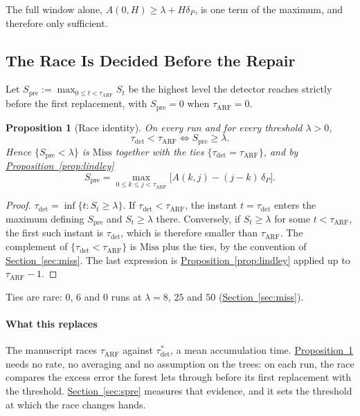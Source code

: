 \documentclass[10pt,conference]{IEEEtran}
\newtheorem{proposition}[theorem]{Proposition}
\theoremstyle{definition}
\begin{document}
\noindent The full window alone, $A(0,H) \ge \lambda + H\delta_P$, is one term of the
maximum, and therefore only sufficient.

\subsection{The Race Is Decided Before the Repair}
\label{sec:race-identity}

Let $S_{\mathrm{pre}} := \max_{0 \le t < \tau_{\mathrm{ARF}}} S_t$ be the highest level the
detector reaches strictly before the first replacement, with $S_{\mathrm{pre}} = 0$ when
$\tau_{\mathrm{ARF}} = 0$.

\begin{proposition}[Race identity]\label{prop:race}
On every run and for every threshold $\lambda > 0$,
\[
  \tau_{\mathrm{det}} < \tau_{\mathrm{ARF}} \iff S_{\mathrm{pre}} \ge \lambda .
\]
Hence $\{S_{\mathrm{pre}} < \lambda\}$ is $\mathrm{Miss}$ together with the ties
$\{\tau_{\mathrm{det}} = \tau_{\mathrm{ARF}}\}$, and by \hyperref[prop:lindley]{Proposition~\ref*{prop:lindley}}
\[
  S_{\mathrm{pre}} = \max_{0 \le k \le j < \tau_{\mathrm{ARF}}}
  \big[A(k,j) - (j-k)\,\delta_P\big].
\]
\end{proposition}

\begin{proof}
$\tau_{\mathrm{det}} = \inf\{t : S_t \ge \lambda\}$. If $\tau_{\mathrm{det}} <
\tau_{\mathrm{ARF}}$, the instant $t = \tau_{\mathrm{det}}$ enters the maximum defining
$S_{\mathrm{pre}}$ and $S_t \ge \lambda$ there. Conversely, if $S_t \ge \lambda$ for some
$t < \tau_{\mathrm{ARF}}$, the first such instant is $\tau_{\mathrm{det}}$, which is
therefore smaller than $\tau_{\mathrm{ARF}}$. The complement of
$\{\tau_{\mathrm{det}} < \tau_{\mathrm{ARF}}\}$ is $\mathrm{Miss}$ plus the ties, by the
convention of \hyperref[sec:miss]{Section~\ref*{sec:miss}}. The last expression is
\hyperref[prop:lindley]{Proposition~\ref*{prop:lindley}} applied up to $\tau_{\mathrm{ARF}} - 1$.
\end{proof}

\noindent Ties are rare: $0$, $6$ and $0$ runs at $\lambda = 8$, $25$ and $50$
(\hyperref[sec:miss]{Section~\ref*{sec:miss}}).

\paragraph{What this replaces} The manuscript races $\tau_{\mathrm{ARF}}$ against
$\tau^*_{\mathrm{det}}$, a mean accumulation time. \hyperref[prop:race]{Proposition~\ref*{prop:race}} needs no
rate, no averaging and no assumption on the trees: on each run, the race compares the
excess error the forest lets through before its first replacement with the threshold.
\hyperref[sec:spre]{Section~\ref*{sec:spre}} measures that evidence, and it sets the threshold at which the race
changes hands.
\end{document}
